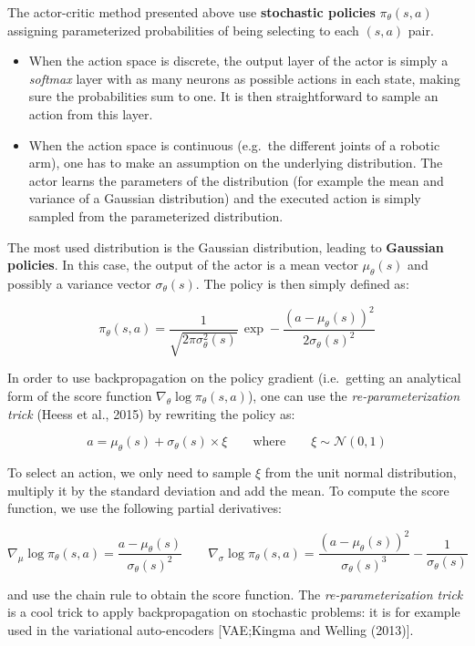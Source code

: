 \documentclass[
  letterpaper,
  DIV=11,
  numbers=noendperiod]{scrreprt}
\begin{document}
The actor-critic method presented above use \textbf{stochastic policies}
\(\pi_\theta(s, a)\) assigning parameterized probabilities of being
selecting to each \((s, a)\) pair.

\begin{itemize}
\item
  When the action space is discrete, the output layer of the actor is
  simply a \emph{softmax} layer with as many neurons as possible actions
  in each state, making sure the probabilities sum to one. It is then
  straightforward to sample an action from this layer.
\item
  When the action space is continuous (e.g.~the different joints of a
  robotic arm), one has to make an assumption on the underlying
  distribution. The actor learns the parameters of the distribution (for
  example the mean and variance of a Gaussian distribution) and the
  executed action is simply sampled from the parameterized distribution.
\end{itemize}

The most used distribution is the Gaussian distribution, leading to
\textbf{Gaussian policies}. In this case, the output of the actor is a
mean vector \(\mu_\theta(s)\) and possibly a variance vector
\(\sigma_\theta(s)\). The policy is then simply defined as:

\[
    \pi_\theta(s, a) = \frac{1}{\sqrt{2\pi\sigma^2_\theta(s)}} \, \exp -\frac{(a - \mu_\theta(s))^2}{2\sigma_\theta(s)^2}
\]

In order to use backpropagation on the policy gradient (i.e.~getting an
analytical form of the score function
\(\nabla_\theta \log \pi_\theta (s, a)\)), one can use the
\emph{re-parameterization trick} (Heess et al., 2015) by rewriting the
policy as:

\[
    a = \mu_\theta(s) + \sigma_\theta(s) \times \xi \qquad \text{where} \qquad \xi \sim \mathcal{N}(0,1)
\]

To select an action, we only need to sample \(\xi\) from the unit normal
distribution, multiply it by the standard deviation and add the mean. To
compute the score function, we use the following partial derivatives:

\[
    \nabla_\mu \log \pi_\theta (s, a) = \frac{a - \mu_\theta(s)}{\sigma_\theta(s)^2} \qquad \nabla_\sigma \log \pi_\theta (s, a) = \frac{(a - \mu_\theta(s))^2}{\sigma_\theta(s)^3} - \frac{1}{\sigma_\theta(s)}
\]

and use the chain rule to obtain the score function. The
\emph{re-parameterization trick} is a cool trick to apply
backpropagation on stochastic problems: it is for example used in the
variational auto-encoders {[}VAE;Kingma and Welling (2013){]}.
\end{document}
